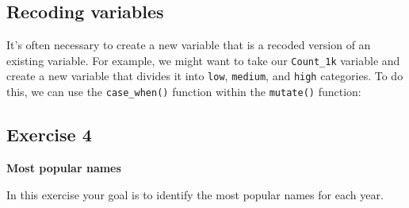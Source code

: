 \documentclass[
]{book}
\newenvironment{Shaded}{\begin{snugshade}}{\end{snugshade}}
\newcommand{\DataTypeTok}[1]{\textcolor[rgb]{0.13,0.29,0.53}{#1}}
\newcommand{\DecValTok}[1]{\textcolor[rgb]{0.00,0.00,0.81}{#1}}
\newcommand{\KeywordTok}[1]{\textcolor[rgb]{0.13,0.29,0.53}{\textbf{#1}}}
\newcommand{\NormalTok}[1]{#1}
\newcommand{\OperatorTok}[1]{\textcolor[rgb]{0.81,0.36,0.00}{\textbf{#1}}}
\newcommand{\StringTok}[1]{\textcolor[rgb]{0.31,0.60,0.02}{#1}}
\begin{document}
\hypertarget{recoding-variables}{%
\subsection{Recoding variables}\label{recoding-variables}}

It's often necessary to create a new variable that is a recoded version of an existing variable.
For example, we might want to take our \texttt{Count\_1k} variable and create a new variable that divides
it into \texttt{low}, \texttt{medium}, and \texttt{high} categories. To do this, we can use the \texttt{case\_when()}
function within the \texttt{mutate()} function:

\begin{Shaded}
\end{Shaded}

\hypertarget{exercise-4}{%
\subsection{Exercise 4}\label{exercise-4}}

\textbf{Most popular names}

In this exercise your goal is to identify the most popular names for each year.
\end{document}
